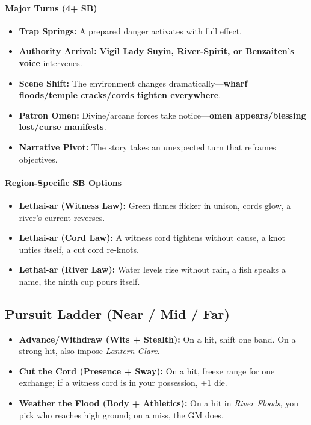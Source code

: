 \paragraph{Major Turns (4+ SB)}
\begin{itemize}
\item \textbf{Trap Springs:} A prepared danger activates with full effect.
\item \textbf{Authority Arrival:} \textbf{Vigil Lady Suyin, River-Spirit, or Benzaiten's voice} intervenes.
\item \textbf{Scene Shift:} The environment changes dramatically---\textbf{wharf floods/temple cracks/cords tighten everywhere}.
\item \textbf{Patron Omen:} Divine/arcane forces take notice---\textbf{omen appears/blessing lost/curse manifests}.
\item \textbf{Narrative Pivot:} The story takes an unexpected turn that reframes objectives.
\end{itemize}

\paragraph{Region-Specific SB Options}
\begin{itemize}
\item \textbf{Lethai-ar (Witness Law):} Green flames flicker in unison, cords glow, a river's current reverses.
\item \textbf{Lethai-ar (Cord Law):} A witness cord tightens without cause, a knot unties itself, a cut cord re-knots.
\item \textbf{Lethai-ar (River Law):} Water levels rise without rain, a fish speaks a name, the ninth cup pours itself.
\end{itemize}

\subsection*{Pursuit Ladder (Near / Mid / Far)}
\begin{itemize}
\item \textbf{Advance/Withdraw (Wits + Stealth):} On a hit, shift one band. On a strong hit, also impose \emph{Lantern Glare}.
\item \textbf{Cut the Cord (Presence + Sway):} On a hit, freeze range for one exchange; if a witness cord is in your possession, +1 die.
\item \textbf{Weather the Flood (Body + Athletics):} On a hit in \emph{River Floods}, you pick who reaches high ground; on a miss, the GM does.
\end{itemize}

